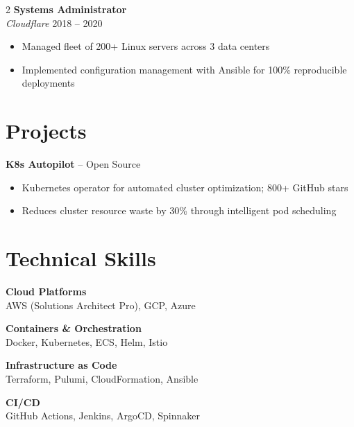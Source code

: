 \documentclass[10pt,letterpaper]{article}
\begin{document}
\begin{multicols}{2}
\textbf{\color{darkgray}Systems Administrator} \\
{\color{accent}\textit{Cloudflare}} \hfill {\small\color{lightgray} 2018 -- 2020}
\begin{itemize}[leftmargin=1em, topsep=1pt, itemsep=0pt, parsep=1pt]
  \item Managed fleet of 200+ Linux servers across 3 data centers
  \item Implemented configuration management with Ansible for 100\% reproducible deployments
\end{itemize}

\section{Projects}

\textbf{\color{darkgray}K8s Autopilot} {\small\color{lightgray}-- Open Source}
\begin{itemize}[leftmargin=1em, topsep=1pt, itemsep=0pt, parsep=1pt]
  \item Kubernetes operator for automated cluster optimization; 800+ GitHub stars
  \item Reduces cluster resource waste by 30\% through intelligent pod scheduling
\end{itemize}


\columnbreak

\section{Technical Skills}

\textbf{\color{sidebar}Cloud Platforms} \\
{\small AWS (Solutions Architect Pro), GCP, Azure}
\vspace{4pt}

\textbf{\color{sidebar}Containers \& Orchestration} \\
{\small Docker, Kubernetes, ECS, Helm, Istio}
\vspace{4pt}

\textbf{\color{sidebar}Infrastructure as Code} \\
{\small Terraform, Pulumi, CloudFormation, Ansible}
\vspace{4pt}

\textbf{\color{sidebar}CI/CD} \\
{\small GitHub Actions, Jenkins, ArgoCD, Spinnaker}
\vspace{4pt}


\end{multicols}
\end{document}
